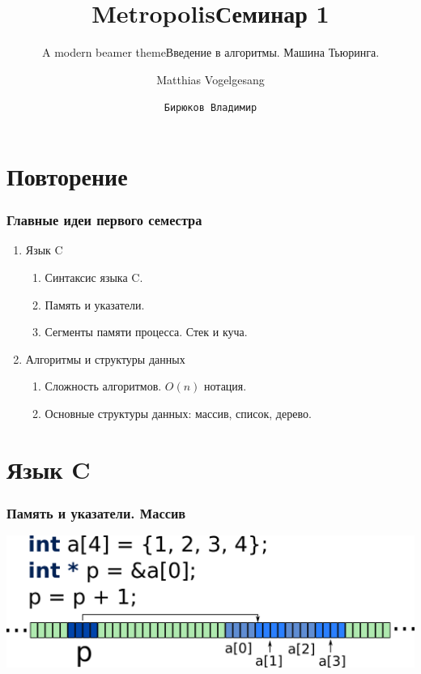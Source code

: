 \documentclass[10pt]{beamer}
\title{Metropolis}
\subtitle{A modern beamer theme}
\date{}
\author{Matthias Vogelgesang}
\institute{Center for modern beamer themes}
\title{Семинар 1}
\subtitle{Введение в алгоритмы. Машина Тьюринга.}
\author{\texttt{Бирюков Владимир}}
\institute{МФТИ}
\begin{document}
%
%

\maketitle


%
%

\section{Повторение}


\begin{frame}[fragile]
\frametitle{Главные идеи первого семестра}
\begin{enumerate}
\item Язык C
\begin{enumerate}
\item Синтаксис языка C.
\item Память и указатели.
\item Сегменты памяти процесса. Стек и куча.
\end{enumerate}
\item Алгоритмы и структуры данных
\begin{enumerate}
\item Сложность алгоритмов. $O(n)$ нотация.
\item Основные структуры данных: массив, список, дерево.
\end{enumerate}
\end{enumerate}
\end{frame}


\section{Язык C}

\begin{frame}[fragile]
\frametitle{Память и указатели. Массив} 
\begin{center}
\includegraphics[width=0.95\linewidth]{images/memory_parrays_2.png}
\end{center}
\end{frame}
\end{document}
